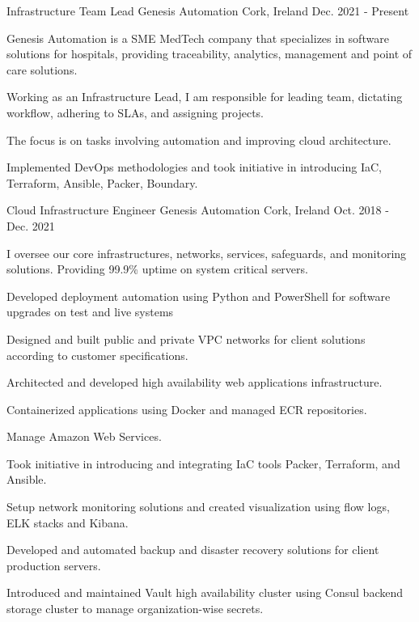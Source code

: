 


\begin{cventries}

\cventry
{Infrastructure Team Lead}
{Genesis Automation}
{Cork, Ireland}
{Dec. 2021 - Present}
{
\begin{cvitems}
\item {Genesis Automation is a SME MedTech company that specializes in software solutions for hospitals, providing traceability, analytics, management and point of care solutions.}
\item {Working as an Infrastructure Lead, I am responsible for leading team, dictating workflow, adhering to SLAs, and assigning projects.}
\item {The focus is on tasks involving automation and improving cloud architecture.}
\item {Implemented DevOps methodologies and took initiative in introducing IaC, Terraform, Ansible, Packer, Boundary.}
\end{cvitems}
}

\cventry
{Cloud Infrastructure Engineer}
{Genesis Automation}
{Cork, Ireland}
{Oct. 2018 - Dec. 2021}
{
\begin{cvitems}
\item {I oversee our core infrastructures, networks, services, safeguards, and monitoring solutions. Providing 99.9\% uptime on system critical servers.}
\item {Developed deployment automation using Python and PowerShell for software upgrades on test and live systems}
\item {Designed and built public and private VPC networks for client solutions according to customer specifications.}
\item {Architected and developed high availability web applications infrastructure.}
\item {Containerized applications using Docker and managed ECR repositories.}
\item {Manage Amazon Web Services.}
\item {Took initiative in introducing and integrating IaC tools Packer, Terraform, and Ansible.}
\item {Setup network monitoring solutions and created visualization using flow logs, ELK stacks and Kibana.}
\item {Developed and automated backup and disaster recovery solutions for client production servers.}
\item {Introduced and maintained Vault high availability cluster using Consul backend storage cluster to manage organization-wise secrets.}
\end{cvitems}
}


\end{cventries}
